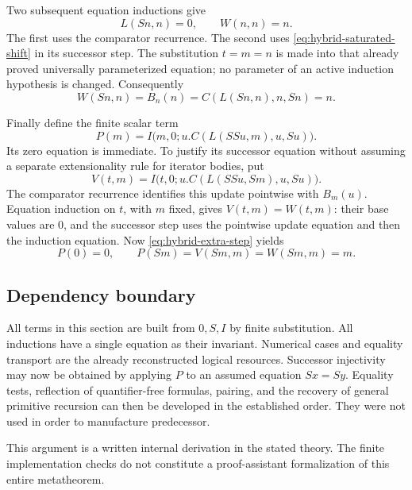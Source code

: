 \documentclass[11pt,letterpaper]{article}
\theoremstyle{definition}\newtheorem{definition}[theorem]{Definition}
\theoremstyle{remark}\newtheorem{remark}[theorem]{Remark}
\begin{document}
Two subsequent equation inductions give
\begin{equation}
 L(Sn,n)=0,\qquad W(n,n)=n.
 \label{eq:hybrid-diagonals}
\end{equation}
The first uses the comparator recurrence.  The second uses
\eqref{eq:hybrid-saturated-shift} in its successor step.  The
substitution $t=m=n$ is made into that already proved universally
parameterized equation; no parameter of an active induction hypothesis
is changed.  Consequently
\begin{equation}
 W(Sn,n)=B_n(n)=C(L(Sn,n),n,Sn)=n.
 \label{eq:hybrid-extra-step}
\end{equation}

Finally define the finite scalar term
\begin{equation}
 P(m)=I\bigl(m,0;u.C(L(SSu,m),u,Su)\bigr).
 \label{eq:hybrid-predecessor-term}
\end{equation}
Its zero equation is immediate.  To justify its successor equation
without assuming a separate extensionality rule for iterator bodies,
put
\[
 V(t,m)=I\bigl(t,0;u.C(L(SSu,Sm),u,Su)\bigr).
\]
The comparator recurrence identifies this update pointwise with
$B_m(u)$.  Equation induction on $t$, with $m$ fixed, gives
$V(t,m)=W(t,m)$: their base values are $0$, and the successor step
uses the pointwise update equation and then the induction equation.
Now \eqref{eq:hybrid-extra-step} yields
\[
 \boxed{\qquad P(0)=0,\qquad P(Sm)=V(Sm,m)=W(Sm,m)=m.\qquad}
\]

\subsection{Dependency boundary}

All terms in this section are built from $0,S,I$ by finite substitution.
All inductions have a single equation as their invariant.  Numerical
cases and equality transport are the already reconstructed logical
resources.  Successor injectivity may now be obtained by applying $P$
to an assumed equation $Sx=Sy$.  Equality tests, reflection of
quantifier-free formulas, pairing, and the recovery of general
primitive recursion can then be developed in the established order.
They were not used in order to manufacture predecessor.

This argument is a written internal derivation in the stated theory.
The finite implementation checks do not constitute a proof-assistant
formalization of this entire metatheorem.

\end{document}
